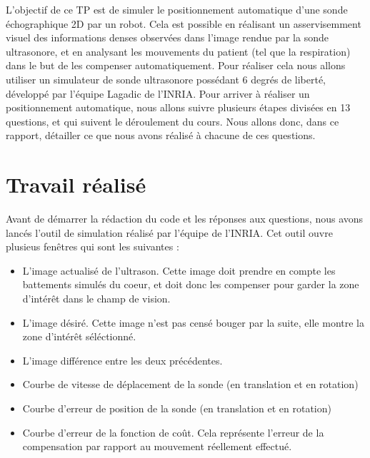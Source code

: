 \documentclass[a4paper,11pt]{article}
\begin{document}
L'objectif de ce TP est de simuler le positionnement automatique d'une sonde \'echographique 2D par un robot. Cela est possible en r\'ealisant un asservisemment visuel des informations denses observ\'ees dans l'image rendue par la sonde ultrasonore, et en analysant les mouvements du patient (tel que la respiration) dans le but de les compenser automatiquement.
Pour r\'ealiser cela nous allons utiliser un simulateur de sonde ultrasonore poss\'edant 6 degr\'es de libert\'e, d\'evelopp\'e par l'\'equipe Lagadic de l'INRIA. Pour arriver \`a r\'ealiser un positionnement automatique, nous allons suivre plusieurs \'etapes divis\'ees en 13 questions, et qui suivent le d\'eroulement du cours. Nous allons donc, dans ce rapport, d\'etailler ce que nous avons r\'ealis\'e \`a chacune de ces questions.


\section{Travail r\'ealis\'e}
Avant de d\'emarrer la r\'edaction du code et les r\'eponses aux questions, nous avons lanc\'es l'outil de simulation r\'ealis\'e par l'\'equipe de l'INRIA. Cet outil ouvre plusieus fen\^etres qui sont les suivantes :
\begin{itemize}
\item L'image actualis\'e de l'ultrason. Cette image doit prendre en compte les battements simul\'es du coeur, et doit donc les compenser pour garder la zone d'int\'er\^et dans le champ de vision.
\item L'image d\'esir\'e. Cette image n'est pas cens\'e bouger par la suite, elle montre la zone d'int\'er\^et s\'el\'ectionn\'e.
\item L'image diff\'erence entre les deux pr\'ec\'edentes.
\item Courbe de vitesse de d\'eplacement de la sonde (en translation et en rotation)
\item Courbe d'erreur de position de la sonde (en translation et en rotation)
\item Courbe d'erreur de la fonction de co\^ut. Cela repr\'esente l'erreur de la compensation par rapport au mouvement r\'eellement effectu\'e.
\end{itemize}
\end{document}
